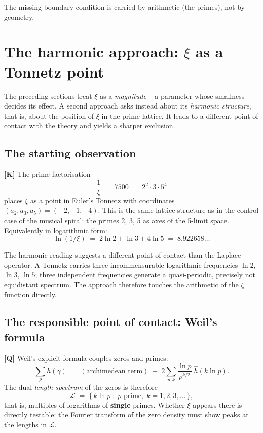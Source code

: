 The missing boundary condition is carried by arithmetic (the primes),
not by geometry.

\section{The harmonic approach: $\xi$ as a Tonnetz point}
\label{sec:tonnetz}

The preceding sections treat $\xi$ as a \emph{magnitude} -- a parameter
whose smallness decides its effect. A second approach asks instead about
its \emph{harmonic structure}, that is, about the position of $\xi$ in
the prime lattice. It leads to a different point of contact with the
theory and yields a sharper exclusion.

\subsection{The starting observation}

\textbf{[K]} The prime factorisation
\[
  \frac{1}{\xi} \;=\; 7500 \;=\; 2^2\cdot 3\cdot 5^4
\]
places $\xi$ as a point in Euler's Tonnetz with coordinates
$(a_2, a_3, a_5) = (-2, -1, -4)$. This is the same lattice structure as
in the control case of the musical spiral: the primes 2, 3, 5 as axes of
the 5-limit space. Equivalently in logarithmic form:
\[
  \ln(1/\xi) \;=\; 2\ln 2 + \ln 3 + 4\ln 5 \;=\; 8.922658\ldots
\]

The harmonic reading suggests a different point of contact than the
Laplace operator. A Tonnetz carries three incommensurable logarithmic
frequencies $\ln 2$, $\ln 3$, $\ln 5$; three independent frequencies
generate a quasi-periodic, precisely not equidistant spectrum. The
approach therefore touches the arithmetic of the $\zeta$ function
directly.

\subsection{The responsible point of contact: Weil's formula}

\textbf{[Q]} Weil's explicit formula couples zeros and primes:
\[
  \sum_\rho h(\gamma) \;=\; (\text{archimedean term})
  \;-\; 2\sum_{p,k} \frac{\ln p}{p^{k/2}}\;\hat h(k\ln p).
\]
The dual \emph{length spectrum} of the zeros is therefore
\[
  \mathcal{L} \;=\; \{\,k\ln p \;:\; p \text{ prime},\; k = 1,2,3,\ldots\,\},
\]
that is, multiples of logarithms of \textbf{single} primes. Whether
$\xi$ appears there is directly testable: the Fourier transform of the
zero density must show peaks at the lengths in $\mathcal{L}$.

